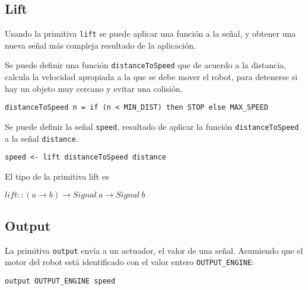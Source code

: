 \subsection{Lift}
  Usando la primitiva \texttt{lift} se puede aplicar una función
a la señal, y obtener una nueva señal más compleja resultado de la
aplicación.

  Se puede definir una función \texttt{distanceToSpeed} que de acuerdo
a la distancia, calcula la velocidad apropiada a la que se debe mover
el robot, para detenerse si hay un objeto muy cercano y evitar una colisión.

\begin{center}
\begin{Verbatim}[frame=single]
distanceToSpeed n = if (n < MIN_DIST) then STOP else MAX_SPEED
\end{Verbatim}
\end{center}


  Se puede definir la señal \texttt{speed}, resultado de aplicar la
función \texttt{distanceToSpeed} a la señal \texttt{distance}.

\begin{center}
\begin{Verbatim}[frame=single]
speed <- lift distanceToSpeed distance
\end{Verbatim}
\end{center}

El tipo de la primitiva lift es

\begin{center}
  $lift :: (a \rightarrow b) \rightarrow Signal\ a \rightarrow Signal\ b$
\end{center}

\subsection{Output}
  La primitiva \texttt{output} envía a un actuador, el valor de una señal.
  Asumiendo que el motor del robot está identificado con el valor entero
\texttt{OUTPUT\_ENGINE}:

\begin{center}
\begin{Verbatim}[frame=single]
output OUTPUT_ENGINE speed
\end{Verbatim}
\end{center}

